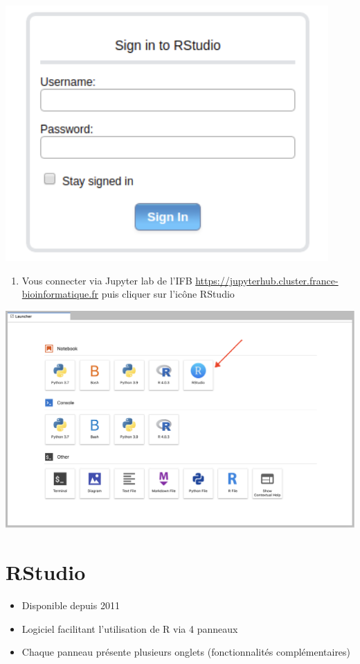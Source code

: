 \documentclass[
]{book}
\providecommand{\tightlist}{%
  \setlength{\itemsep}{0pt}\setlength{\parskip}{0pt}}
\begin{document}
\includegraphics{images/coRstudio.png}

\begin{enumerate}
\def\labelenumi{\arabic{enumi}.}
\setcounter{enumi}{2}
\tightlist
\item
  Vous connecter via Jupyter lab de l'IFB
  \url{https://jupyterhub.cluster.france-bioinformatique.fr}
  puis cliquer sur l'icône RStudio
\end{enumerate}

\includegraphics{images/jupyterRstudio.png}

\hypertarget{rstudio}{%
\section{RStudio}\label{rstudio}}

\begin{itemize}
\tightlist
\item
  Disponible depuis 2011
\item
  Logiciel facilitant l'utilisation de R via 4 panneaux
\item
  Chaque panneau présente plusieurs onglets (fonctionnalités complémentaires)
\end{itemize}
\end{document}
